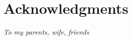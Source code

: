 


\bigskip

\begingroup
\let\clearpage\relax
\let\cleardoublepage\relax
\let\cleardoublepage\relax
\chapter*{Acknowledgments}

\emph{To my parents, wife, friends} 


\endgroup



